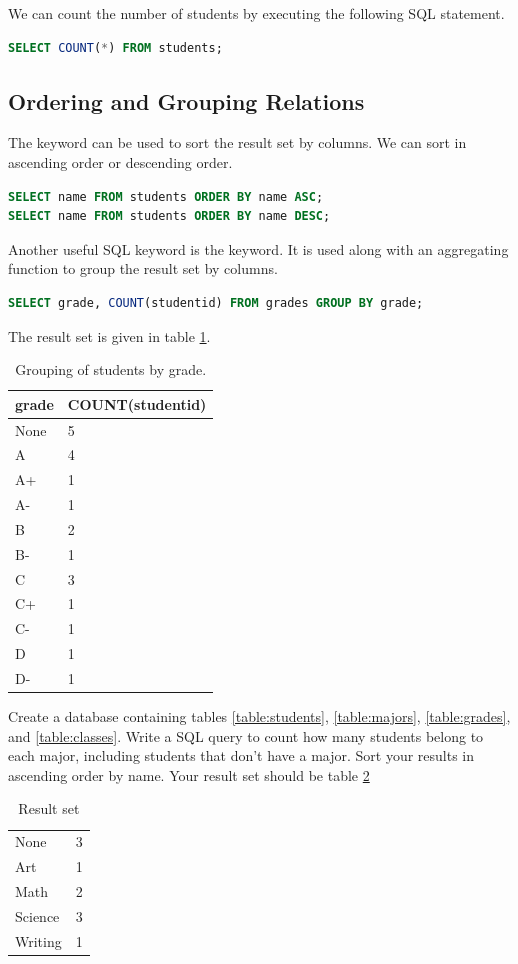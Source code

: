 We can count the number of students by executing the following SQL statement.
\begin{lstlisting}[language=SQL]
SELECT COUNT(*) FROM students;
\end{lstlisting}

\subsection*{Ordering and Grouping Relations}
The  keyword can be used to sort the result set by columns.
We can sort in ascending order or descending order.
\begin{lstlisting}[language=SQL]
SELECT name FROM students ORDER BY name ASC;
SELECT name FROM students ORDER BY name DESC;
\end{lstlisting}

Another useful SQL keyword is the  keyword.
It is used along with an aggregating function to group the result set by columns.
\begin{lstlisting}[language=SQL]
SELECT grade, COUNT(studentid) FROM grades GROUP BY grade;
\end{lstlisting}
The result set is given in table \ref{table:group_by_grade}.
\begin{table}
\begin{tabular}{|l|l|}
\hline
grade & COUNT(studentid) \\
\hline
None & 5 \\
A & 4 \\
A+ & 1 \\
A- & 1 \\
B & 2 \\
B- & 1 \\
C & 3 \\
C+ & 1 \\
C- & 1 \\
D & 1 \\
D- & 1 \\
\hline
\end{tabular}
\caption{Grouping of students by grade.}
\label{table:group_by_grade}
\end{table}

\begin{problem}
Create a database containing tables \ref{table:students}, \ref{table:majors}, \ref{table:grades}, and \ref{table:classes}.
Write a SQL query to count how many students belong to each major, including students that don't have a major.
Sort your results in ascending order by name.
Your result set should be table \ref{table:grouporder}
\begin{table}[H]
\begin{tabular}{|l|l|}
\hline
None & 3 \\
Art & 1 \\
Math & 2 \\
Science & 3 \\
Writing & 1 \\
\hline
\end{tabular}
\caption{Result set}
\label{table:grouporder}
\end{table}
\label{prob:studentmajors}
\end{problem}

